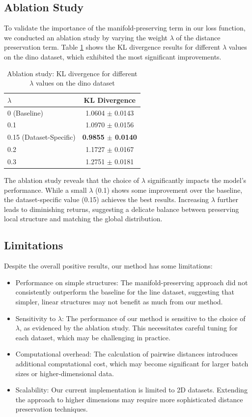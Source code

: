 \documentclass{article} %
\begin{document}
\subsection{Ablation Study}
To validate the importance of the manifold-preserving term in our loss function, we conducted an ablation study by varying the weight $\lambda$ of the distance preservation term. Table \ref{tab:ablation} shows the KL divergence results for different $\lambda$ values on the dino dataset, which exhibited the most significant improvements.

\begin{table}[h]
\centering
\caption{Ablation study: KL divergence for different $\lambda$ values on the dino dataset}
\label{tab:ablation}
\begin{tabular}{lc}
\toprule
$\lambda$ & KL Divergence \\
\midrule
0 (Baseline) & 1.0604 $\pm$ 0.0143 \\
0.1 & 1.0970 $\pm$ 0.0156 \\
0.15 (Dataset-Specific) & \textbf{0.9855 $\pm$ 0.0140} \\
0.2 & 1.1727 $\pm$ 0.0167 \\
0.3 & 1.2751 $\pm$ 0.0181 \\
\bottomrule
\end{tabular}
\end{table}

The ablation study reveals that the choice of $\lambda$ significantly impacts the model's performance. While a small $\lambda$ (0.1) shows some improvement over the baseline, the dataset-specific value (0.15) achieves the best results. Increasing $\lambda$ further leads to diminishing returns, suggesting a delicate balance between preserving local structure and matching the global distribution.

\subsection{Limitations}
Despite the overall positive results, our method has some limitations:

\begin{itemize}
    \item Performance on simple structures: The manifold-preserving approach did not consistently outperform the baseline for the line dataset, suggesting that simpler, linear structures may not benefit as much from our method.
    \item Sensitivity to $\lambda$: The performance of our method is sensitive to the choice of $\lambda$, as evidenced by the ablation study. This necessitates careful tuning for each dataset, which may be challenging in practice.
    \item Computational overhead: The calculation of pairwise distances introduces additional computational cost, which may become significant for larger batch sizes or higher-dimensional data.
    \item Scalability: Our current implementation is limited to 2D datasets. Extending the approach to higher dimensions may require more sophisticated distance preservation techniques.
\end{itemize}
\end{document}
